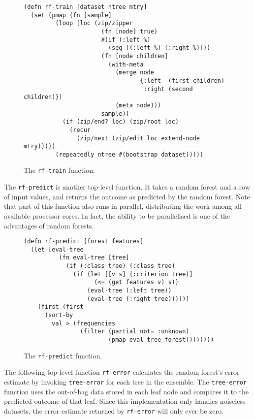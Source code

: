 \documentclass[a4paper,man,12pt,apacite,floatsintext]{apa6} %
\begin{document}
\begin{figure}[H]
\caption{The \texttt{rf-train} function.}
\begin{verbatim}
(defn rf-train [dataset ntree mtry]
  (set (pmap (fn [sample]
         (loop [loc (zip/zipper
                      (fn [node] true)
                      #(if (:left %)
                        (seq [(:left %) (:right %)]))
                      (fn [node children]
                        (with-meta
                          (merge node
                                 {:left  (first children)
                                  :right (second children)})
                          (meta node)))
                      sample)]
           (if (zip/end? loc) (zip/root loc)
             (recur
               (zip/next (zip/edit loc extend-node mtry)))))
         (repeatedly ntree #(bootstrap dataset)))))
\end{verbatim}
\end{figure}

The \texttt{rf-predict} is another top-level function.
It takes a random forest and a row of input values, and returns the outcome as
predicted by the random forest.
Note that part of this function also runs in parallel, distributing the work among all
available processor cores.
In fact, the ability to be parallelised is one of the advantages of random forests.

\begin{figure}[H]
\caption{The \texttt{rf-predict} function.}
\begin{verbatim}
(defn rf-predict [forest features]
  (let [eval-tree
          (fn eval-tree [tree]
            (if (:class tree) (:class tree)
              (if (let [[v s] (:criterion tree)]
                    (<= (get features v) s))
                  (eval-tree (:left tree))
                  (eval-tree (:right tree)))))]
    (first (first
      (sort-by
        val > (frequencies
                (filter (partial not= :unknown)
                        (pmap eval-tree forest))))))))
\end{verbatim}
\end{figure}

The following top-level function \texttt{rf-error} calculates the random forest's
error estimate by invoking \texttt{tree-error} for each tree in the ensemble.
The \texttt{tree-error} function uses the out-of-bag data stored in each leaf node
and compares it to the predicted outcome of that leaf.
Since this implementation only handles noiseless datasets, the error estimate
returned by \texttt{rf-error} will only ever be zero.
\end{document}
